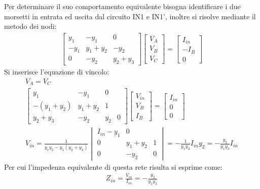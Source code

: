 \documentclass{article}
\numberwithin{equation}{subsection}
\begin{document}
Per determinare il suo comportamento equivalente bisogna identificare i due morsetti in entrata ed uscita dal circuito IN1 e IN1', inoltre si risolve 
mediante il metodo dei nodi:
\begin{gather*}
    \begin{bmatrix}
        y_1&-y_1&0\\-y_1&y_1+y_2&-y_2\\0&-y_2&y_2+y_3
    \end{bmatrix}\begin{bmatrix}
        V_A\\V_B\\V_C
    \end{bmatrix}=\begin{bmatrix}
        I_{in}\\-I_B\\0
    \end{bmatrix}
\end{gather*}
Si inserisce l'equazione di vincolo:
\begin{gather*}
    V_A=V_C\\
    \begin{bmatrix}
        y_1&-y_1&0\\-(y_1+y_2)&y_1+y_2&1\\y_2+y_3&-y_2&y_2&0
    \end{bmatrix}\begin{bmatrix}
        V_{in}\\V_B\\I_B
    \end{bmatrix}=\begin{bmatrix}
        I_{in}\\0\\0
    \end{bmatrix}\\
    V_{in}=\displaystyle\frac{1}{y_1y_2-y_1(y_2+y_3)}\begin{vmatrix}
        I_{in}-y_1&0\\0&y_1+y_2&1\\0&-y_2&0
    \end{vmatrix}=-\frac{1}{y_1y_3}I_{in}y_2=-\frac{y_2}{y_1y_3}I_{in}
\end{gather*}
Per cui l'impedenza equivalente di questa rete risulta si esprime come:
\begin{gather*}
    Z_{in}=\displaystyle\frac{V_{in}}{I_{in}}=-\frac{y_2}{y_1y_3}
\end{gather*}
\end{document}
